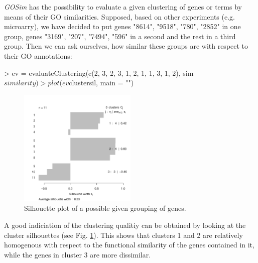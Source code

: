 \documentclass[12pt,a4paper]{article}
\begin{document}
\emph{GOSim} has the possibility to evaluate a given clustering of genes or terms by means of their GO similarities. Supposed, based on other experiments (e.g. microarry), we have decided to put genes "8614", "9518", "780", "2852" in one group, genes "3169", "207", "7494", "596" in a second and the rest in a third group. Then we can ask ourselves, how similar these groups are with respect to their GO annotations:
\begin{Schunk}
\begin{Sinput}
> ev = evaluateClustering(c(2, 3, 2, 3, 1, 2, 1, 1, 3, 1, 2), sim$similarity)
> plot(ev$clustersil, main = "")
\end{Sinput}
\end{Schunk}
\begin{figure}[t]
\begin{center}
\includegraphics[width=0.5\textwidth]{GOClustersil.pdf}
\caption{\label{Fig:GOClustersil}Silhouette plot of a possible given grouping of genes.}
\end{center}
\end{figure}

A good indiciation of the clustering qualitiy can be obtained by looking at the cluster silhouettes \cite{rousseeuw87} (see Fig. \ref{Fig:GOClustersil}). This shows that clusters 1 and 2 are relatively homogenous with respect to the functional similarity of the genes contained in it, while the genes in cluster 3 are more dissimilar.



\end{document}
